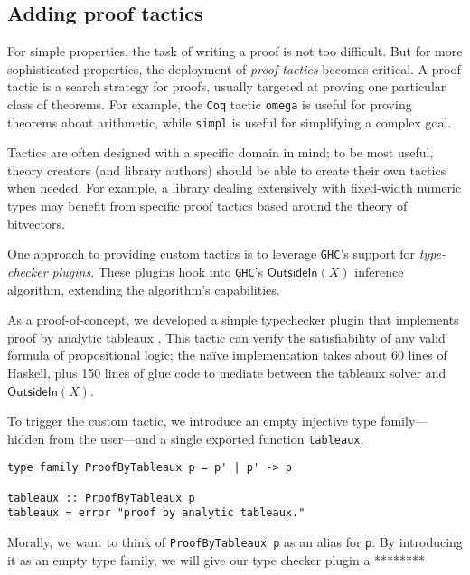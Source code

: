 \documentclass[format=sigplan, review=false, screen=true]{acmart}
\begin{document}
\inputminted{haskell}{nzlic.hs}

\subsection{Adding proof tactics}

For simple properties, the task of writing a proof is not too difficult. But for
more sophisticated properties, the deployment of \emph{proof tactics} becomes
critical. A proof tactic is a search strategy for proofs, usually targeted at
proving one particular class of theorems. For example, the \texttt{Coq} tactic
\texttt{omega} is useful for proving theorems about arithmetic, while
\texttt{simpl} is useful for simplifying a complex goal.

Tactics are often designed with a specific domain in mind; to be most useful,
theory creators (and library authors) should be able to create their own tactics
when needed. For example, a library dealing extensively with fixed-width numeric types
may benefit from specific proof tactics based around the theory of bitvectors.

One approach to providing custom tactics is to leverage \texttt{GHC}'s support for
\emph{type-checker plugins}. These plugins hook into \texttt{GHC}'s $\textsf{OutsideIn}(X)$
inference algorithm, extending the algorithm's capabilities.

As a proof-of-concept, we developed a simple typechecker plugin that implements
proof by analytic tableaux \cite{smullyan1995first}. This tactic can verify the satisfiability of any
valid formula of propositional logic; the na\"ive implementation takes about
60 lines of Haskell, plus 150 lines of glue code to mediate between
the tableaux solver and $\textsf{OutsideIn}(X)$.

To trigger the custom tactic, we introduce an empty injective type family---hidden
from the user---and a single exported function \texttt{tableaux}.
\begin{verbatim}
type family ProofByTableaux p = p' | p' -> p

tableaux :: ProofByTableaux p
tableaux = error "proof by analytic tableaux."
\end{verbatim}
Morally, we want to think of \texttt{ProofByTableaux p} as an alias for \texttt{p}.
By introducing it as an empty type family, we will give our type checker plugin a
********
\end{document}
